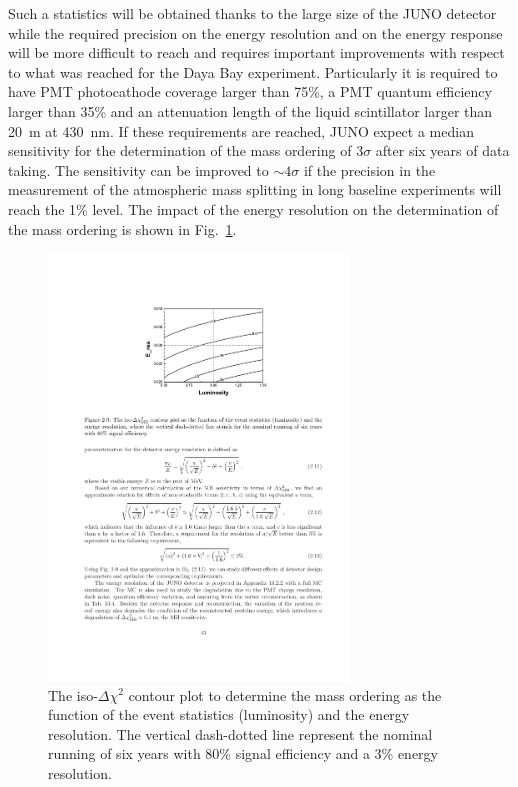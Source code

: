 Such a statistics will be obtained thanks to the large size of the JUNO detector while the required precision on the energy resolution and on the energy response will be more difficult to reach and requires important improvements with respect to what was reached for the Daya Bay experiment. Particularly it is required to have PMT photocathode coverage larger than 75\%, a PMT quantum efficiency larger than 35\% and an attenuation length of the liquid scintillator larger than 20~m at 430~nm. If these requirements are reached, JUNO expect a median sensitivity for the determination of the mass ordering of $3\sigma$ after six years of data taking. The sensitivity can be improved to $\sim4\sigma$ if the precision in the measurement of the atmospheric mass splitting in long baseline experiments will reach the 1\% level.
The impact of the energy resolution on the determination of the mass ordering is shown in Fig.~\ref{fig:junoeneres}.

\begin{figure} [htbp!]
\begin{center}
\includegraphics[width=8cm]{figures/juno_energyres.pdf}
\caption{\label{fig:junoeneres} The iso-$\Delta\chi^2$ contour plot to determine the mass ordering as the function of the event statistics (luminosity) and the energy resolution. The vertical dash-dotted line represent the nominal running of six years with 80\% signal efficiency and a 3\% energy resolution.}
\end{center}
\end{figure}


